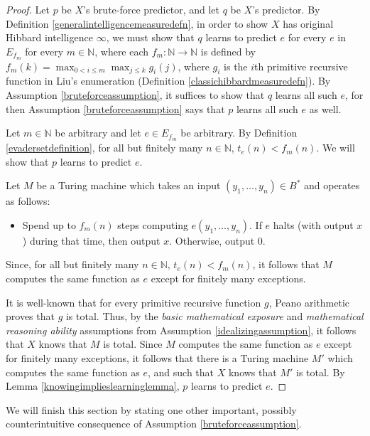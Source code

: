 \documentclass{article}
\begin{document}
\begin{proof}
    Let $p$ be $X$'s brute-force predictor, and let $q$ be $X$'s predictor.
    By Definition \ref{generalintelligencemeasuredefn}, in order
    to show $X$ has original Hibbard intelligence $\infty$, we must
    show that $q$ learns to predict $e$ for every $e$ in $E_{f_m}$ for
    every $m\in\mathbb N$,
    where each $f_m:\mathbb N\to\mathbb N$ is defined by
    $f_m(k)=\max_{0<i\leq m}\max_{j\leq k}g_i(j)$,
    where $g_i$ is the $i$th primitive recursive function
    in Liu's enumeration
    (Definition \ref{classichibbardmeasuredefn}).
    By Assumption \ref{bruteforceassumption}, it suffices to show that
    $q$ learns all such $e$, for then Assumption \ref{bruteforceassumption}
    says that $p$ learns all such $e$ as well.

    Let $m\in\mathbb N$ be arbitrary and let $e\in E_{f_m}$ be arbitrary.
    By Definition \ref{evadersetdefinition},
    for all but finitely many $n\in\mathbb N$, $t_e(n)<f_m(n)$.
    We will show that $p$ learns to predict $e$.

    Let $M$ be a Turing machine which takes an input
    $(y_1,\ldots,y_n)\in B^*$ and
    operates as follows:
    \begin{itemize}
        \item
        Spend up to $f_m(n)$ steps computing $e(y_1,\ldots,y_n)$.
        If $e$ halts (with output $x$) during that time, then output $x$.
        Otherwise, output $0$.
    \end{itemize}
    Since, for all but finitely many $n\in\mathbb N$, $t_e(n)<f_m(n)$,
    it follows that $M$ computes the same function as $e$ except for finitely
    many exceptions.

    It is well-known that for every primitive recursive function $g$, Peano
    arithmetic proves that $g$ is total. Thus, by the \emph{basic mathematical
    exposure} and \emph{mathematical reasoning ability} assumptions from
    Assumption \ref{idealizingassumption}, it follows that $X$ knows that
    $M$ is total. Since $M$ computes the same function as $e$ except for
    finitely many exceptions, it follows that there is a Turing machine $M'$
    which computes the same function as $e$, and such that $X$
    knows that $M'$ is total. By Lemma \ref{knowingimplieslearninglemma},
    $p$ learns to predict $e$.
\end{proof}

We will finish this section by stating one other important, possibly
counterintuitive consequence of Assumption \ref{bruteforceassumption}.
\end{document}
